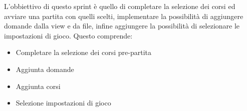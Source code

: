 L'obbiettivo di questo sprint è quello di completare la selezione dei corsi ed avviare una partita con quelli scelti, implementare la possibilità di aggiungere domande dalla view e da file, infine aggiungere la possibilità di selezionare le impostazioni di gioco. 
Questo comprende:
\begin{itemize}
    \item Completare la selezione dei corsi pre-partita
    \item Aggiunta domande
    \item Aggiunta corsi
    \item Selezione impostazioni di gioco
\end{itemize} 